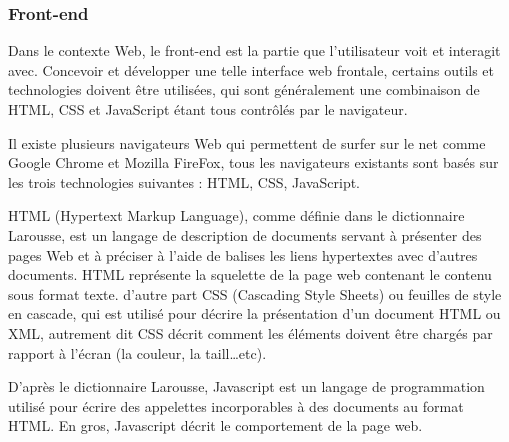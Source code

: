 \subsubsection{Front-end }
\par Dans le contexte Web, le front-end est la partie que l'utilisateur voit et
interagit avec. Concevoir et développer une telle interface web frontale,
certains outils et technologies doivent être utilisées, qui sont généralement
une combinaison de HTML, CSS et JavaScript étant tous contrôlés par le
navigateur.\cite{ref9}
\par Il existe plusieurs navigateurs Web qui permettent de surfer sur le net
comme Google Chrome et Mozilla FireFox, tous les navigateurs existants sont
basés sur les trois technologies suivantes : HTML, CSS, JavaScript.
\par HTML (Hypertext Markup Language), comme définie dans le dictionnaire
Larousse, est un langage de description de documents servant à présenter des
pages Web et à préciser à l'aide de balises les liens hypertextes avec d'autres
documents. HTML représente la squelette de la page web contenant le contenu
sous format texte. d’autre part CSS (Cascading Style Sheets) ou feuilles de
style en cascade, qui est utilisé pour décrire la présentation d’un document
HTML ou XML, autrement dit CSS décrit comment les éléments doivent être chargés
par rapport à l'écran (la couleur, la taill…etc).\cite{ref10}
\par D'après le dictionnaire Larousse, Javascript est un langage de
programmation utilisé pour écrire des appelettes incorporables à des documents
au format HTML. En gros, Javascript décrit le comportement de la page web.